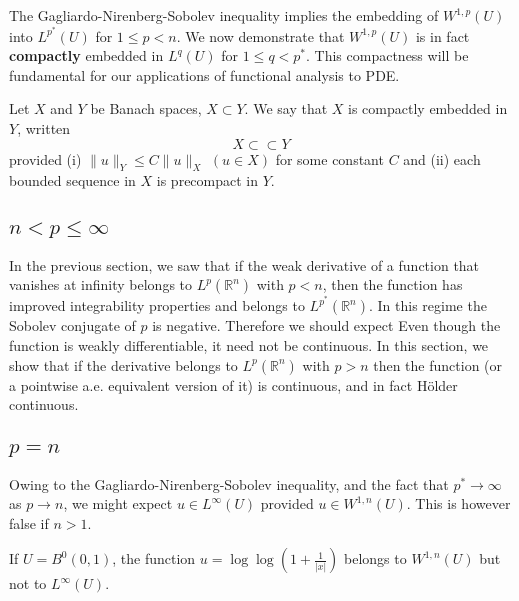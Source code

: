 The Gagliardo-Nirenberg-Sobolev inequality implies the embedding of $W^{1,p}(U)$ into $L^{p^*}(U)$ for $1\le p<n$.
We now demonstrate that $W^{1,p}(U)$ is in fact \textbf{compactly} embedded in $L^q(U)$ for $1\le q<p^*$.
This compactness will be fundamental for our applications of functional analysis to PDE.
\begin{definition}
    Let $X$ and $Y$ be Banach spaces, $X\subset Y$. We say that $X$ is compactly embedded in $Y$, written 
    \[X\subset \subset Y\] 
    provided \newline 
    (i) $\|u\|_Y\le C\|u\|_X$ $(u\in X)$ for some constant $C$ and \newline 
    (ii) each bounded sequence in $X$ is precompact in $Y$.
\end{definition}


\begin{theorem}
    
\end{theorem}


\subsection{\texorpdfstring{$n<p\le\infty$}{n<p}}
In the previous section, we saw that if the weak derivative of a function that
vanishes at infinity belongs to $L^p(\mathbb{R}^n)$ with $p < n$, then the function has improved
integrability properties and belongs to $L^{p^*}(\mathbb{R}^n)$.
In this regime the Sobolev conjugate of $p$ is negative. Therefore we should expect 
Even though the function is weakly differentiable, it need not be continuous. 
In this section, we show that if the derivative belongs to $L^p(\mathbb{R}^n)$ with $p > n$ then the function (or a pointwise a.e. equivalent
version of it) is continuous, and in fact H\"older continuous. 
\begin{theorem}
    
\end{theorem}

\subsection{\texorpdfstring{$p=n$}{p=n}}
Owing to the Gagliardo-Nirenberg-Sobolev inequality, and the fact that $p^*\to\infty$ as $p\to n$, we might expect $u\in L^\infty(U)$ provided 
$u\in W^{1,n}(U)$. This is however false if $n>1$.
\begin{example}
    If $U=B^0(0,1)$, the function $u=\log\log (1+\frac{1}{|x|})$ belongs to $W^{1,n}(U)$ but not to $L^\infty(U)$.
\end{example}

